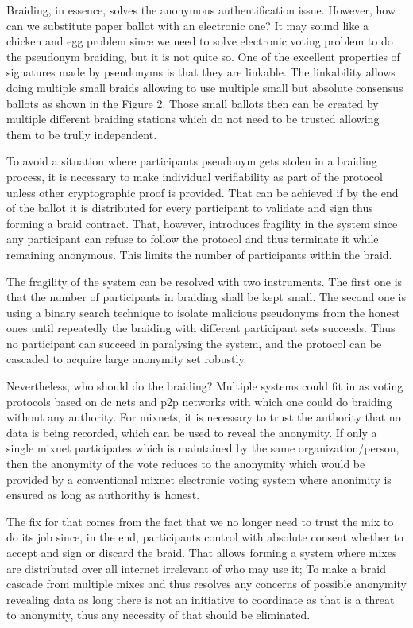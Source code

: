 \documentclass[12pt,a4paper]{article}
\begin{document}
Braiding, in essence, solves the anonymous authentification issue. However, how can we substitute paper ballot with an electronic one? It may sound like a chicken and egg problem since we need to solve electronic voting problem to do the pseudonym braiding, but it is not quite so. One of the excellent properties of signatures made by pseudonyms is that they are linkable. The linkability allows doing multiple small braids allowing to use multiple small but absolute consensus ballots as shown in the Figure 2. Those small ballots then can be created by multiple different braiding stations which do not need to be trusted allowing them to be trully independent.\par
To avoid a situation where participants pseudonym gets stolen in a braiding process, it is necessary to make individual verifiability as part of the protocol unless other cryptographic proof is provided. That can be achieved if by the end of the ballot it is distributed for every participant to validate and sign thus forming a braid contract. That, however, introduces fragility in the system since any participant can refuse to follow the protocol and thus terminate it while remaining anonymous. This limits the number of participants within the braid.\par
The fragility of the system can be resolved with two instruments. The first one is that the number of participants in braiding shall be kept small. The second one is using a binary search technique to isolate malicious pseudonyms from the honest ones until repeatedly the braiding with different participant sets succeeds. Thus no participant can succeed in paralysing the system, and the protocol can be cascaded to acquire large anonymity set robustly.\par
Nevertheless, who should do the braiding? Multiple systems could fit in as voting protocols based on dc nets and p2p networks with which one could do braiding without any authority. For mixnets, it is necessary to trust the authority that no data is being recorded, which can be used to reveal the anonymity. If only a single mixnet participates which is maintained by the same organization/person, then the anonymity of the vote reduces to the anonymity which would be provided by a conventional mixnet electronic voting system where anonimity is ensured as long as authorithy is honest.\par
The fix for that comes from the fact that we no longer need to trust the mix to do its job since, in the end, participants control with absolute consent whether to accept and sign or discard the braid. That allows forming a system where mixes are distributed over all internet irrelevant of who may use it; To make a braid cascade from multiple mixes and thus resolves any concerns of possible anonymity revealing data as long there is not an initiative to coordinate as that is a threat to anonymity, thus any necessity of that should be eliminated.\par
\end{document}
